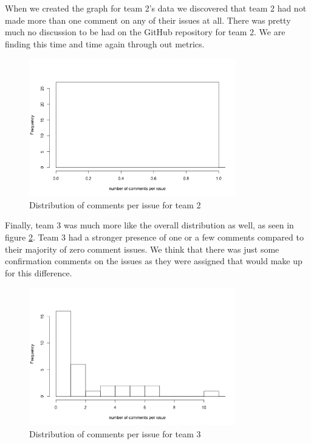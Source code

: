 \documentclass[conference]{IEEEtran}
\begin{document}
When we created the graph for team 2's data we discovered that team 2 had not made more than one comment on any of their issues at all. There was pretty much no discussion to be had on the GitHub repository for team 2. We are finding this time and time again through out metrics. 

\begin{figure}[H]
    \centering
    \includegraphics[width=9cm]{../AprilProject/pic/distribution/comment_per_issue_distribution_team2.png}
    \caption{Distribution of comments per issue for team 2}
    \label{comments_issue_team2}
\end{figure}

Finally, team 3 was much more like the overall distribution as well, as seen in figure \ref{comments_issue_team3}. Team 3 had a stronger presence of one or a few comments compared to their majority of zero comment issues. We think that there was just some confirmation comments on the issues as they were assigned that would make up for this difference. 

\begin{figure}[H]
    \centering
    \includegraphics[width=9cm]{../AprilProject/pic/distribution/comment_per_issue_distribution_team3.png}
    \caption{Distribution of comments per issue for team 3}
    \label{comments_issue_team3}
\end{figure}
\end{document}
